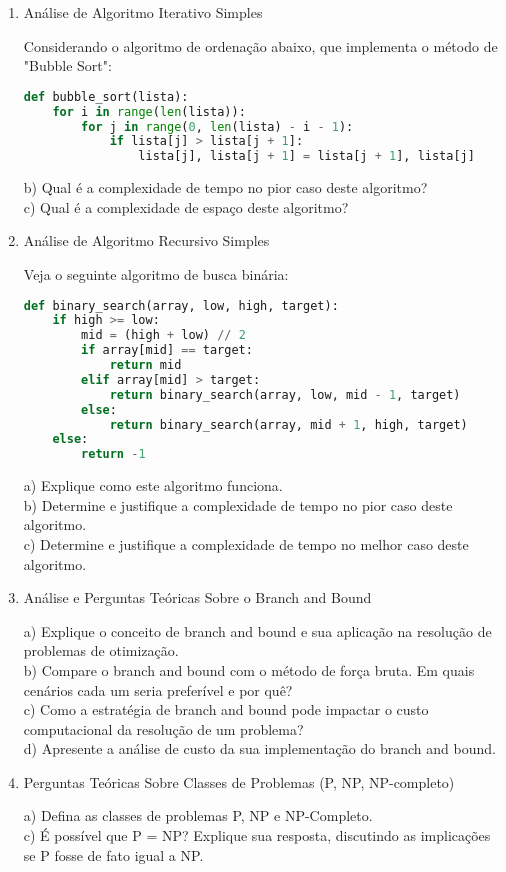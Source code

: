 \documentclass{article}
\begin{document}
\begin{enumerate}
    

\item Análise de Algoritmo Iterativo Simples

Considerando o algoritmo de ordenação abaixo, que implementa o método de "Bubble Sort":

\begin{lstlisting}[language=Python]
def bubble_sort(lista):
    for i in range(len(lista)):
        for j in range(0, len(lista) - i - 1):
            if lista[j] > lista[j + 1]:
                lista[j], lista[j + 1] = lista[j + 1], lista[j]
\end{lstlisting}

\noindent
b) Qual é a complexidade de tempo no pior caso deste algoritmo? \\
c) Qual é a complexidade de espaço deste algoritmo?

\item Análise de Algoritmo Recursivo Simples

Veja o seguinte algoritmo de busca binária:

\begin{lstlisting}[language=Python]
def binary_search(array, low, high, target):
    if high >= low:
        mid = (high + low) // 2
        if array[mid] == target:
            return mid
        elif array[mid] > target:
            return binary_search(array, low, mid - 1, target)
        else:
            return binary_search(array, mid + 1, high, target)
    else:
        return -1
\end{lstlisting}

\noindent
a) Explique como este algoritmo funciona. \\
b) Determine e justifique a complexidade de tempo no pior caso deste algoritmo. \\
c) Determine e justifique a complexidade de tempo no melhor caso deste algoritmo. \\

\item Análise e Perguntas Teóricas Sobre o Branch and Bound

\noindent
a) Explique o conceito de branch and bound e sua aplicação na resolução de problemas de otimização. \\
b) Compare o branch and bound com o método de força bruta. Em quais cenários cada um seria preferível e por quê? \\
c) Como a estratégia de branch and bound pode impactar o custo computacional da resolução de um problema? \\
d) Apresente a análise de custo da sua implementação do branch and bound.

\item Perguntas Teóricas Sobre Classes de Problemas (P, NP, NP-completo)

\noindent
a) Defina as classes de problemas P, NP e NP-Completo. \\
c) É possível que P = NP? Explique sua resposta, discutindo as implicações se P fosse de fato igual a NP. 

\end{enumerate}


%
%
\end{document}
